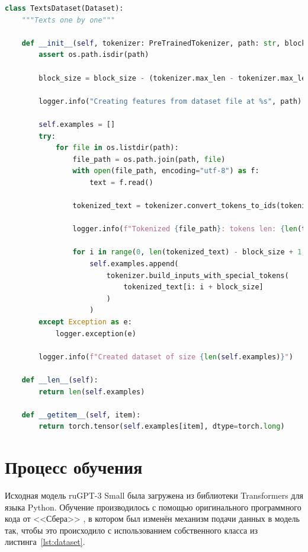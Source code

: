 \begin{lstlisting}[language=Python, caption={Класс датасета, хранящий данные в разбитом виде}, label=lst:dataset]
class TextsDataset(Dataset):
    """Texts one by one"""

    def __init__(self, tokenizer: PreTrainedTokenizer, path: str, block_size=2048):
        assert os.path.isdir(path)

        block_size = block_size - (tokenizer.max_len - tokenizer.max_len_single_sentence)

        logger.info("Creating features from dataset file at %s", path)

        self.examples = []
        try:
            for file in os.listdir(path):
                file_path = os.path.join(path, file)
                with open(file_path, encoding="utf-8") as f:
                    text = f.read()

                tokenized_text = tokenizer.convert_tokens_to_ids(tokenizer.tokenize(text))
                
                logger.info(f"Tokenized {file_path}: tokens len: {len(tokenized_text)}")

                for i in range(0, len(tokenized_text) - block_size + 1, block_size):  # Truncate in block of block_size
                    self.examples.append(
                        tokenizer.build_inputs_with_special_tokens(
                            tokenized_text[i: i + block_size]
                        )
                    )
        except Exception as e:
            logger.exception(e)
        
        logger.info(f"Created dataset of size {len(self.examples)}")

    def __len__(self):
        return len(self.examples)

    def __getitem__(self, item):
        return torch.tensor(self.examples[item], dtype=torch.long)
\end{lstlisting}

\section{Процесс обучения}

Исходная модель ruGPT-3 Small была загружена из библиотеки Transformers для языка Python. Обучение производилось с помощью оригинального программного кода от <<Сбера>> \cite{gh:sber}, в котором был изменён механизм подачи данных в модель так, чтобы это происходило с использованием собственного класса  из листинга \ref*{lst:dataset}.

